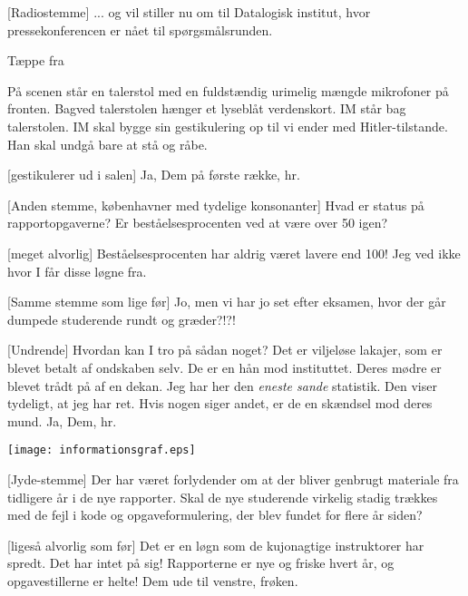 \documentclass[a4paper]{article}
\begin{document}
\begin{sketch}

[Radiostemme] ... og vil stiller nu om til Datalogisk institut, hvor
pressekonferencen er nået til spørgsmålsrunden.

\scene Tæppe fra

\scene På scenen står en talerstol med en fuldstændig urimelig mængde
mikrofoner på fronten. Bagved talerstolen hænger et lyseblåt
verdenskort. IM står bag talerstolen. IM skal bygge sin gestikulering
op til vi ender med Hitler-tilstande. Han skal undgå bare at stå og råbe.

[gestikulerer ud i salen] Ja, Dem på første række, hr.

[Anden stemme, københavner med tydelige konsonanter] Hvad
er status på rapportopgaverne? Er
beståelsesprocenten ved at være over 50 igen?

[meget alvorlig] Beståelsesprocenten har aldrig været lavere
end 100! Jeg ved ikke hvor I får disse løgne fra.

[Samme stemme som lige før] Jo, men vi har jo set efter eksamen, hvor
der går dumpede studerende rundt og græder?!?!

[Undrende] Hvordan kan I tro på sådan noget? Det er viljeløse
lakajer, som er blevet betalt af ondskaben selv. De er en hån mod
instituttet. Deres mødre er blevet trådt på af en dekan.  Jeg
har her den \emph{eneste sande} statistik. Den viser tydeligt, at jeg har
ret. Hvis nogen siger andet, er de en skændsel mod deres mund.
 Ja, Dem, hr.

\texttt{[image: informationsgraf.eps]}\typeout{+-----------------------------+}\typeout{+-----------------------------+}

[Jyde-stemme] Der har været forlydender om at der
bliver genbrugt materiale fra tidligere år i de nye
rapporter. Skal de nye studerende virkelig stadig trækkes med de fejl i
kode og opgaveformulering, der blev fundet for flere år siden?

[ligeså alvorlig som før] Det er en løgn som de kujonagtige
instruktorer har spredt. Det har intet på sig! Rapporterne er nye og
friske hvert år, og opgavestillerne er helte!  Dem ude
til venstre, frøken.


\end{sketch}
\end{document}
